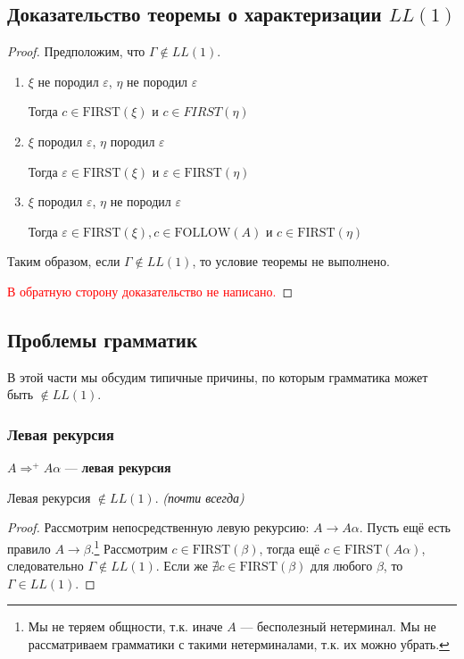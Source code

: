 \subsection{Доказательство теоремы о характеризации \(LL(1)\)}

\begin{proof}\itemfix
    Предположим, что \(\Gamma \notin LL(1)\).
    \begin{enumerate}
        \item \(\xi\) не породил \(\varepsilon\), \(\eta\) не породил \(\varepsilon\)

              Тогда \(c \in \mathrm{FIRST}(\xi)\) и \(c \in FIRST(\eta)\)

        \item \(\xi\) породил \(\varepsilon\), \(\eta\) породил \(\varepsilon\)

              Тогда \(\varepsilon \in \mathrm{FIRST}(\xi)\) и \(\varepsilon \in \mathrm{FIRST}(\eta)\)

        \item \(\xi\) породил \(\varepsilon\), \(\eta\) не породил \(\varepsilon\)

              Тогда \(\varepsilon \in \mathrm{FIRST}(\xi), c \in \mathrm{FOLLOW}(A)\) и \(c \in \mathrm{FIRST}(\eta)\)
    \end{enumerate}

    Таким образом, если \(\Gamma \notin LL(1)\), то условие теоремы не выполнено.

    \textcolor{red}{В обратную сторону доказательство не написано.} %
\end{proof}

\subsection{Проблемы грамматик}

В этой части мы обсудим типичные причины, по которым грамматика может быть \(\notin LL(1)\).

\subsubsection{Левая рекурсия}

\begin{definition}
    \(A \Rightarrow^{ +} A\alpha\) --- \textbf{левая рекурсия}
\end{definition}

\begin{statement}
    Левая рекурсия \(\notin LL(1)\). \textit{(почти всегда)}
\end{statement}
\begin{proof}
    Рассмотрим непосредственную левую рекурсию: \(A \to A\alpha\). Пусть ещё есть правило \(A \to \beta\).\footnote{Мы не теряем общности, т.к. иначе \(A\) --- бесполезный нетерминал. Мы не рассматриваем грамматики с такими нетерминалами, т.к. их можно убрать.} Рассмотрим \(c \in \mathrm{FIRST}(\beta)\), тогда ещё \(c \in \mathrm{FIRST}(A\alpha)\), следовательно \(\Gamma \notin LL(1)\). Если же \(\nexists c \in \mathrm{FIRST}(\beta)\) для любого \(\beta\), то \(\Gamma \in LL(1)\).
\end{proof}

